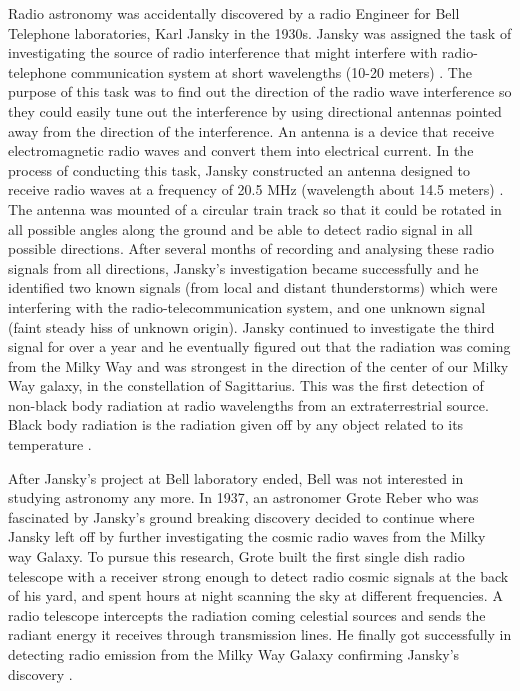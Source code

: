Radio astronomy was accidentally discovered by a radio Engineer for Bell Telephone laboratories, Karl Jansky in the 1930s.
Jansky was assigned the task of investigating the source of radio interference that might interfere with radio-telephone communication system at short wavelengths (10-20 meters) \citep{verschuur2015invisible}.
The purpose of this task was to find out the direction of the radio wave interference so they could easily tune out the interference by using directional antennas pointed away from the direction of the interference. An antenna is a device that receive electromagnetic radio waves and convert them into electrical current. In the process of conducting this task, Jansky constructed an antenna designed to receive radio waves at a frequency of 20.5 MHz (wavelength about 14.5 meters) \citep{Jansky0}. The antenna was mounted of a circular train track so that it could be rotated in all possible angles along the ground and be able to detect radio signal in all possible directions. After several months of recording and analysing these radio signals from all directions, Jansky's investigation became successfully and he identified two known signals (from local and  distant thunderstorms) which were interfering with the radio-telecommunication system, and one unknown signal (faint steady hiss of unknown origin). Jansky continued to investigate the third signal for over a year and he eventually figured out that the radiation was coming from the Milky Way and was strongest in the direction of the center of our Milky Way
galaxy, in the constellation of Sagittarius. This was the first detection of non-black body radiation at radio wavelengths from an extraterrestrial source. Black body radiation is the radiation given off by any object
related to its temperature \citep{Jansky1}.

After Jansky's project at Bell laboratory ended, Bell was not interested in studying astronomy any more. In 1937, an astronomer Grote Reber who was fascinated by Jansky's ground breaking discovery decided to continue where Jansky left off by further investigating the cosmic radio waves from the Milky way Galaxy. To pursue this research, Grote built the first single dish radio telescope with a receiver strong enough to detect radio cosmic signals at the back of his yard, and spent hours at night scanning the sky at different frequencies. A radio telescope intercepts the radiation coming celestial sources and sends the radiant energy it receives through transmission lines. He finally got successfully in detecting radio emission from the Milky Way Galaxy confirming Jansky's discovery \citep{verschuur2015invisible}.   

